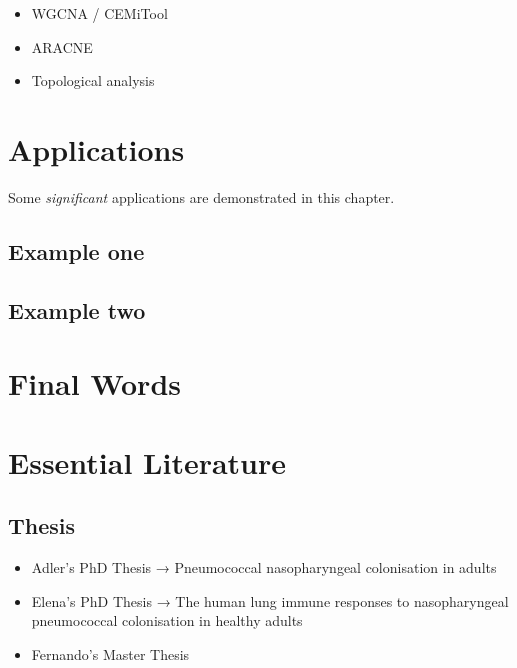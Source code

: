 \documentclass[
]{book}
\providecommand{\tightlist}{%
  \setlength{\itemsep}{0pt}\setlength{\parskip}{0pt}}
\begin{document}
\begin{itemize}
\tightlist
\item
  WGCNA / CEMiTool
\end{itemize}

\begin{itemize}
\item
  ARACNE
\item
  Topological analysis
\end{itemize}

\hypertarget{applications}{%
\chapter{Applications}\label{applications}}

Some \emph{significant} applications are demonstrated in this chapter.

\hypertarget{example-one}{%
\section{Example one}\label{example-one}}

\hypertarget{example-two}{%
\section{Example two}\label{example-two}}

\hypertarget{final-words}{%
\chapter{Final Words}\label{final-words}}

\hypertarget{appendix-appendix}{%
\appendix}


\hypertarget{essential-literature}{%
\chapter{Essential Literature}\label{essential-literature}}

\hypertarget{thesis}{%
\section{Thesis}\label{thesis}}

\begin{itemize}
\item
  Adler's PhD Thesis → Pneumococcal nasopharyngeal colonisation in adults
\item
  Elena's PhD Thesis → The human lung immune responses to nasopharyngeal pneumococcal colonisation in healthy adults
\item
  Fernando's Master Thesis
\end{itemize}
\end{document}
